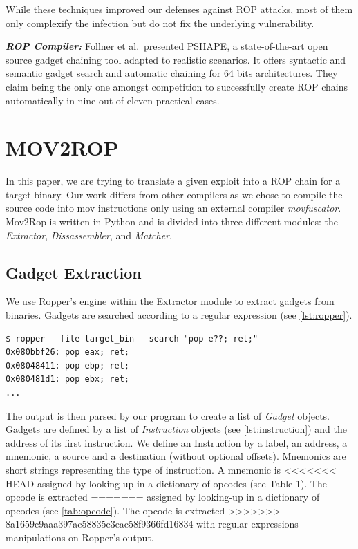 \documentclass[10pt,twocolumn]{article}
\begin{document}
While these techniques improved our defenses against ROP attacks, most of them only
 complexify the infection but do not fix the underlying vulnerability.

\textbf{\textit{ROP Compiler:}} Follner et al.\ presented
PSHAPE\cite{barthe_pshape:_2016}, a state-of-the-art open source gadget
chaining tool adapted to realistic scenarios. It offers syntactic and semantic
gadget search and automatic chaining for 64 bits architectures.  They claim
being the only one amongst competition to successfully create ROP chains
automatically in nine out of eleven practical cases.


\section{MOV2ROP}

In this paper, we are trying to translate a given exploit into a ROP chain for
a target binary. Our work differs from other compilers as we chose to compile
the source code into mov instructions only using an external compiler
\textit{movfuscator}. Mov2Rop is written in Python and is divided into three
different modules: the \textit{Extractor}, \textit{Dissassembler}, and
\textit{Matcher}.

\subsection{Gadget Extraction}

We use Ropper's engine\cite{sashs_ropper} within the Extractor  module to
extract gadgets from binaries. Gadgets are searched according to a regular
expression (see \autoref{lst:ropper}).

\begin{lstlisting}[float=h,aboveskip=\medskipamount,belowskip=0pt,caption=Ropper
search engine,label=lst:ropper]
$ ropper --file target_bin --search "pop e??; ret;"
0x080bbf26: pop eax; ret;
0x08048411: pop ebp; ret;
0x080481d1: pop ebx; ret;
...
\end{lstlisting}

The output is then parsed by our program to create a list of \textit{Gadget}
objects. Gadgets are defined by a list of \textit{Instruction} objects (see
\autoref{lst:instruction}) and the
address of its first instruction. We define an Instruction by a label, an
address, a mnemonic, a source and a destination (without optional offsets).
Mnemonics are short strings representing the type of instruction. A mnemonic is
<<<<<<< HEAD
assigned by looking-up in a dictionary of opcodes (see Table 1). The opcode is extracted
=======
assigned by looking-up in a dictionary of opcodes (see \autoref{tab:opcode}). The opcode is extracted
>>>>>>> 8a1659c9aaa397ac58835e3eac58f9366fd16834
with regular expressions manipulations on Ropper's output.
\end{document}
